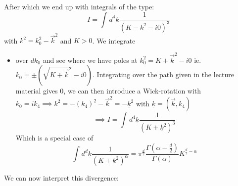 \documentclass{report}
\begin{document}
After which we end up with integrals of the type: \[
I = \int_{}^{} d^{4}k \frac{1}{\left( K - k^2 - i 0 \right) ^3}  
\] 
with $k^2 = k_0^2 - \vec{k}^2 $ and $K > 0$. We integrate
\begin{itemize}
  \item over $dk_0$ and see where we have poles at $k_0^2 = K + \vec{k}^2 - i 0$ ie. $k_0 = \pm \left( \sqrt{K+\vec{k}^2} - i 0 \right)  $. Integrating over the path given in the lecture material gives $0$, we can then introduce a Wick-rotation with $k_0 = i k_4 \implies k^2 = -\left( k_4 \right)^2 - \vec{k}^2 = -\underline{k}^2$ with $\underline{k} = \left( \vec{k}, k_4 \right) $ \[
      \implies I = \int_{}^{} d^{4} \underline{k}  \frac{1}{\left(K + \underline{k}^2\right) ^3}  
  \] Which is a special case of \[
  \int_{}^{} d^{d} \underline{k} \frac{1}{\left( K + \underline{k}^2 \right)^{\alpha} } = \pi^{\frac{d}{2} } \frac{\Gamma\left( \alpha - \frac{d}{2}  \right) }{\Gamma\left( \alpha \right) } K^{\frac{d}{2} - \alpha}  
  \] 
\end{itemize}
We can now interpret this divergence:
\end{document}
